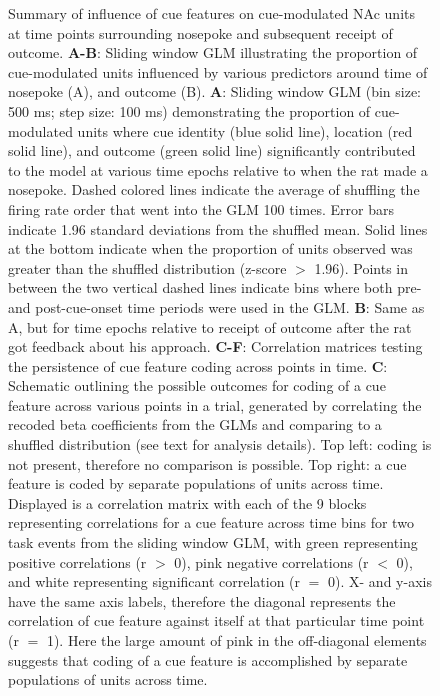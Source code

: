 \documentclass[11pt]{article}
\newcommand{\bsf}[1]{\textbf{#1}}
\begin{document}
\begin{figure}[ht!]
\caption{Summary of influence of cue features on cue-modulated NAc units at time points surrounding nosepoke and subsequent receipt of outcome. \bsf{A-B}: Sliding window GLM illustrating the proportion of cue-modulated units influenced by various predictors around time of nosepoke (A), and outcome (B). \bsf{A}: Sliding window GLM (bin size: 500 ms; step size: 100 ms) demonstrating the proportion of cue-modulated units where cue identity (blue solid line), location (red solid line), and outcome (green solid line) significantly contributed to the model at various time epochs relative to when the rat made a nosepoke. Dashed colored lines indicate the average of shuffling the firing rate order that went into the GLM 100 times. Error bars indicate 1.96 standard deviations from the shuffled mean. Solid lines at the bottom indicate when the proportion of units observed was greater than the shuffled distribution (z-score $>$ 1.96). Points in between the two vertical dashed lines indicate bins where both pre- and post-cue-onset time periods were used in the GLM. \bsf{B}: Same as A, but for time epochs relative to receipt of outcome after the rat got feedback about his approach. \bsf{C-F}: Correlation matrices testing the persistence of cue feature coding across points in time. \bsf{C}: Schematic outlining the possible outcomes for coding of a cue feature across various points in a trial, generated by correlating the recoded beta coefficients from the GLMs and comparing to a shuffled distribution (see text for analysis details). Top left: coding is not present, therefore no comparison is possible. Top right: a cue feature is coded by separate populations of units across time. Displayed is a correlation matrix with each of the 9 blocks representing correlations for a cue feature across time bins for two task events from the sliding window GLM, with green representing positive correlations (r $>$ 0), pink negative correlations (r $<$ 0), and white representing significant correlation (r $=$ 0). X- and y-axis have the same axis labels, therefore the diagonal represents the correlation of cue feature against itself at that particular time point (r $=$ 1). Here the large amount of pink in the off-diagonal elements suggests that coding of a cue feature is accomplished by separate populations of units across time.}
\label{fig:Q2}
\end{figure} \clearpage
\end{document}
